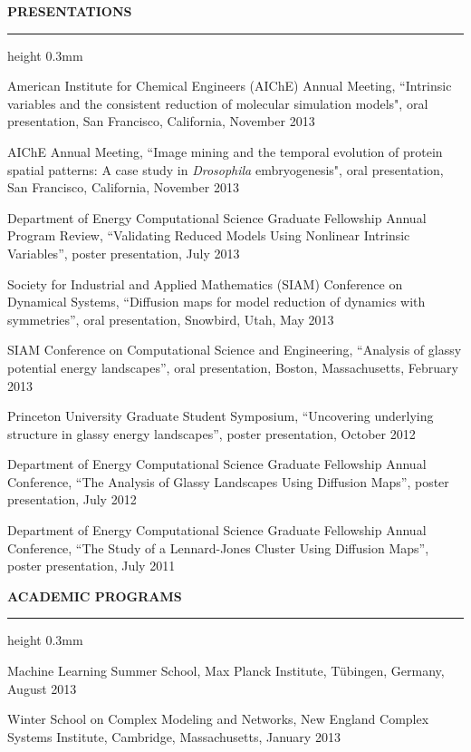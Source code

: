 \documentclass[letterpaper,10pt]{article}
\newenvironment{itemize*}
  {\begin{itemize}
    \setlength{\parskip}{-2pt}}
  {\end{itemize}}
\newcommand{\cvheading}[1]{
\vspace{0.11in}
\noindent
\MakeUppercase{\bf #1}
\vspace{0.06in}
{\hrule height 0.3mm}
\vspace{0.06in}}
\begin{document}
\cvheading{Presentations}
\begin{itemize*}
\item American Institute for Chemical Engineers (AIChE) Annual Meeting,  ``Intrinsic variables and the consistent reduction of molecular simulation models", oral presentation, San Francisco, California, November 2013
\item AIChE Annual Meeting,  ``Image mining and the temporal evolution of protein spatial patterns: A case study in {\it Drosophila} embryogenesis", oral presentation, San Francisco, California, November 2013
\item Department of Energy Computational Science Graduate Fellowship Annual Program Review, ``Validating Reduced Models Using Nonlinear Intrinsic Variables'', poster presentation, July 2013
\item Society for Industrial and Applied Mathematics (SIAM) Conference on Dynamical Systems, ``Diffusion maps for model reduction of dynamics with symmetries'', oral presentation, Snowbird, Utah, May 2013
\item SIAM Conference on Computational Science and Engineering, ``Analysis of glassy potential energy landscapes'', oral presentation, Boston, Massachusetts, February 2013
\item Princeton University Graduate Student Symposium, ``Uncovering underlying structure in glassy energy landscapes'', poster presentation, October 2012
\item Department of Energy Computational Science Graduate Fellowship Annual Conference, ``The Analysis of Glassy Landscapes Using Diffusion Maps'', poster presentation, July 2012
\item Department of Energy Computational Science Graduate Fellowship Annual Conference, ``The Study of a Lennard-Jones Cluster Using Diffusion Maps'', poster presentation, July 2011
\end{itemize*}

\cvheading{Academic Programs}
\begin{itemize*}
\item Machine Learning Summer School, Max Planck Institute, T\"{u}bingen, Germany, August 2013
\item Winter School on Complex Modeling and Networks, New England Complex Systems Institute, Cambridge, Massachusetts, January 2013
\end{itemize*}
\end{document}
